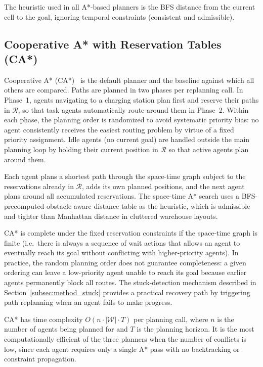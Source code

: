 The heuristic used in all A*-based planners is the BFS distance from the
current cell to the goal, ignoring temporal constraints (consistent and
admissible).


\subsection{Cooperative A* with Reservation Tables (CA*)}
\label{subsec:method_castar}

Cooperative A* (CA*)~\cite{silver2005cooperative} is the default planner and
the baseline against which all others are compared.
Paths are planned in two phases per replanning call.
In Phase~1, agents navigating to a charging station plan first and reserve their
paths in $\mathcal{R}$, so that task agents automatically route around them in
Phase~2.
Within each phase, the planning order is randomized to avoid systematic priority
bias: no agent consistently receives the easiest routing problem by virtue of a
fixed priority assignment.
Idle agents (no current goal) are handled outside the main planning loop by
holding their current position in $\mathcal{R}$ so that active agents plan
around them.

Each agent plans a shortest path through the space-time graph subject to the
reservations already in $\mathcal{R}$, adds its own planned positions, and the
next agent plans around all accumulated reservations.
The space-time A* search uses a BFS-precomputed obstacle-aware distance table
as the heuristic, which is admissible and tighter than Manhattan distance in
cluttered warehouse layouts.

CA* is complete under the fixed reservation constraints if the space-time graph
is finite (i.e.\ there is always a sequence of wait actions that allows an agent
to eventually reach its goal without conflicting with higher-priority agents).
In practice, the random planning order does not guarantee completeness: a given
ordering can leave a low-priority agent unable to reach its goal because earlier
agents permanently block all routes.
The stuck-detection mechanism described in
Section~\ref{subsec:method_stuck} provides a practical recovery path by
triggering path replanning when an agent fails to make progress.

CA* has time complexity $O(n \cdot |\mathcal{W}| \cdot T)$ per planning
call, where $n$ is the number of agents being planned for and $T$ is the
planning horizon.
It is the most computationally efficient of the three planners when the
number of conflicts is low, since each agent requires only a single A*
pass with no backtracking or constraint propagation.


